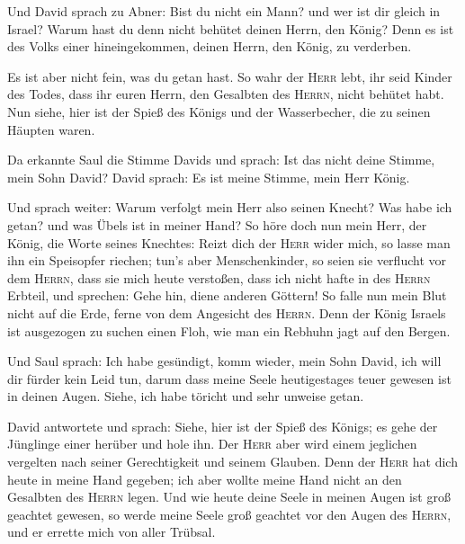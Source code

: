  Und David sprach zu Abner: Bist du nicht ein Mann? und
wer ist dir gleich in Israel? Warum hast du denn nicht behütet deinen
Herrn, den König? Denn es ist des Volks einer hineingekommen, deinen
Herrn, den König, zu verderben.

 Es ist aber nicht fein, was du getan hast. So wahr der
\textsc{Herr} lebt, ihr seid Kinder des Todes, dass ihr euren Herrn, den
Gesalbten des \textsc{Herrn}, nicht behütet habt. Nun siehe, hier ist
der Spieß des Königs und der Wasserbecher, die zu seinen Häupten waren.

 Da erkannte Saul die Stimme Davids und sprach: Ist das
nicht deine Stimme, mein Sohn David? David sprach: Es ist meine Stimme,
mein Herr König.

 Und sprach weiter: Warum verfolgt mein Herr also seinen
Knecht? Was habe ich getan? und was Übels ist in meiner Hand?
 So höre doch nun mein Herr, der König, die Worte seines
Knechtes: Reizt dich der \textsc{Herr} wider mich, so lasse man ihn ein
Speisopfer riechen; tun's aber Menschenkinder, so seien sie verflucht
vor dem \textsc{Herrn}, dass sie mich heute verstoßen, dass ich nicht
hafte in des \textsc{Herrn} Erbteil, und sprechen: Gehe hin, diene
anderen Göttern!  So falle nun mein Blut nicht auf die
Erde, ferne von dem Angesicht des \textsc{Herrn}. Denn der König Israels
ist ausgezogen zu suchen einen Floh, wie man ein Rebhuhn jagt auf den
Bergen.

 Und Saul sprach: Ich habe gesündigt, komm wieder, mein
Sohn David, ich will dir fürder kein Leid tun, darum dass meine Seele
heutigestages teuer gewesen ist in deinen Augen. Siehe, ich habe töricht
und sehr unweise getan.

 David antwortete und sprach: Siehe, hier ist der Spieß
des Königs; es gehe der Jünglinge einer herüber und hole ihn.
 Der \textsc{Herr} aber wird einem jeglichen vergelten
nach seiner Gerechtigkeit und seinem Glauben. Denn der \textsc{Herr} hat
dich heute in meine Hand gegeben; ich aber wollte meine Hand nicht an
den Gesalbten des \textsc{Herrn} legen.  Und wie heute
deine Seele in meinen Augen ist groß geachtet gewesen, so werde meine
Seele groß geachtet vor den Augen des \textsc{Herrn}, und er errette
mich von aller Trübsal.

